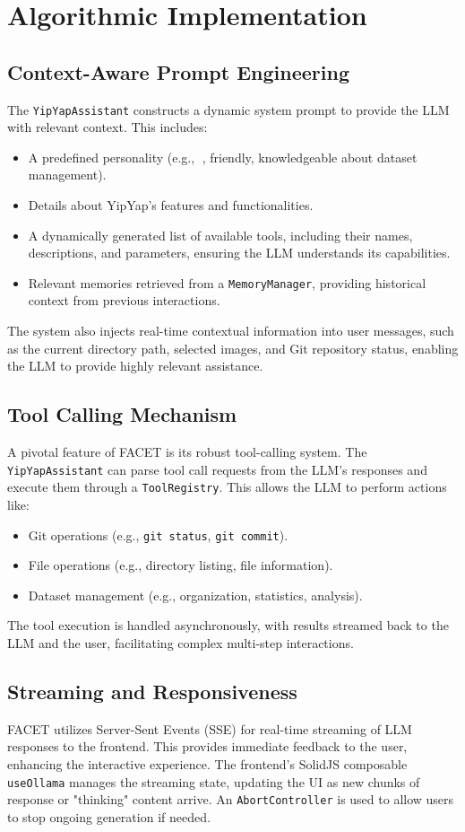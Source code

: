 \documentclass[10pt]{article}
\begin{document}
\section{Algorithmic Implementation}
\subsection{Context-Aware Prompt Engineering}
The \texttt{YipYapAssistant} constructs a dynamic system prompt to provide the LLM with relevant context. This includes:
\begin{itemize}
    \item A predefined personality (e.g., 🦊, friendly, knowledgeable about dataset management).
    \item Details about YipYap's features and functionalities.
    \item A dynamically generated list of available tools, including their names, descriptions, and parameters, ensuring the LLM understands its capabilities.
    \item Relevant memories retrieved from a \texttt{MemoryManager}, providing historical context from previous interactions.
\end{itemize}
The system also injects real-time contextual information into user messages, such as the current directory path, selected images, and Git repository status, enabling the LLM to provide highly relevant assistance.

\subsection{Tool Calling Mechanism}
A pivotal feature of FACET is its robust tool-calling system. The \texttt{YipYapAssistant} can parse tool call requests from the LLM's responses and execute them through a \texttt{ToolRegistry}. This allows the LLM to perform actions like:
\begin{itemize}
    \item Git operations (e.g., \texttt{git status}, \texttt{git commit}).
    \item File operations (e.g., directory listing, file information).
    \item Dataset management (e.g., organization, statistics, analysis).
\end{itemize}
The tool execution is handled asynchronously, with results streamed back to the LLM and the user, facilitating complex multi-step interactions.

\subsection{Streaming and Responsiveness}
FACET utilizes Server-Sent Events (SSE) for real-time streaming of LLM responses to the frontend. This provides immediate feedback to the user, enhancing the interactive experience. The frontend's SolidJS composable \texttt{useOllama} manages the streaming state, updating the UI as new chunks of response or "thinking" content arrive. An \texttt{AbortController} is used to allow users to stop ongoing generation if needed.
\end{document}
